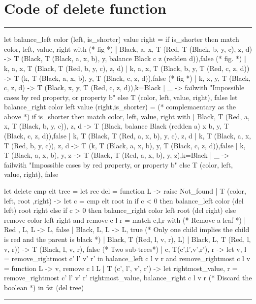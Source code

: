 \documentclass[10pt,a4paper]{article}
\newenvironment{codeblock}%
{\center \minipage{\textwidth} \vspace{6pt} \hrule \vspace{6pt} \minted{ocaml}}%
{\endminted \hrule \vspace{6pt} \endminipage \endcenter}
\begin{document}
{}


\newpage

\appendix

\section{Code of delete function}
\label{sec:ann1}

\begin{codeblock}
let balance_left color (left, is_shorter) value right =
    if is_shorter then
        match color, left, value, right with
        (* fig *)
        | Black, a, x, T (Red, T (Black, b, y, c), z, d)
          -> T (Black, T (Black, a, x, b), y, balance Black c z (redden d)),false
        (* fig.  *)
        | k, a, x, T (Black, T (Red, b, y, c), z, d)
        | k, a, x, T (Black, b, y, T (Red, c, z, d))
          -> T (k, T (Black, a, x, b), y, T (Black, c, z, d)),false
        (* fig *)
        | k, x, y, T (Black, c, z, d)
          -> T (Black, x, y, T (Red, c, z, d)),k=Black
        | _ -> failwith "Impossible cases by red property, or property b"
    else
        T (color, left, value, right), false
let balance_right color left value (right,is_shorter) =
   (* complemaentary as the above *)
   if is_shorter then
       match color, left, value, right with
        | Black, T (Red, a, x, T (Black, b, y, c)), z, d
          -> T (Black, balance Black (redden a) x b, y, T (Black, c, z, d)),false
        | k, T (Black, T (Red, a, x, b), y, c), z, d
        | k, T (Black, a, x, T (Red, b, y, c)), z, d
          -> T (k, T (Black, a, x, b), y, T (Black, c, z, d)),false
        | k, T (Black, a, x, b), y, z
          -> T (Black, T (Red, a, x, b), y, z),k=Black
        | _ -> failwith "Impossible cases by red property, or property b"
    else
        T (color, left, value, right), false

let delete cmp elt tree =
    let rec del = function
        L -> raise Not_found
      | T (color, left, root ,right) ->
        let c = cmp elt root in
        if c < 0 then balance_left color (del left) root right
        else if c > 0 then balance_right color left root (del right)
        else remove color left right
  and remove c l r = match c,l,r with
    (* Remove a leaf *)
    | Red  , L, L -> L, false
    | Black, L, L -> L, true
    (* Only one child implies the child is red and the parent is black *)
    | Black, T (Red, l, v, r), L)
    | Black, L, T (Red, l, v, r)) -> T (Black, l, v, r), false
    (* Two sub-trees*)
    | c, T(c',l',v',r'), r ->
      let v, l = remove_rightmost c' l' v' r' in
           balance_left c l v r
  and remove_rightmost c l v = function
      L -> v, remove c l L
    | T (c', l', v', r') ->
      let rightmost_value, r = remove_rightmost c' l' v' r'
      rightmost_value, balance_right c l v r
  (* Discard the boolean *)
  in fst (del tree)
\end{codeblock}
\end{document}
